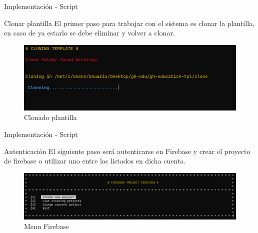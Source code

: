 \documentclass{beamer}
\begin{document}
    \begin{frame}{Implementación - Script}
    
        \begin{block}{Clonar plantilla}
            El primer paso para trabajar con el sistema es clonar la plantilla, en caso de ya estarlo se debe eliminar y volver a clonar.          
        \end{block}

        \begin{center}  
            \begin{figure}
                \includegraphics[width=.9\textwidth]{Presentacion/implementacion/script/clone.png}
                \caption{Clonado plantilla}
            \end{figure}            
        \end{center}
        
        
    \end{frame}  

    \begin{frame}{Implementación - Script}
    
        \begin{block}{Autenticación}
            El siguiente paso será autenticarse en Firebase y crear el proyecto de firebase o utilizar uno entre los listados en dicha cuenta.        
        \end{block}

        \begin{center}  
            \begin{figure}
                \includegraphics[width=.9\textwidth]{Presentacion/implementacion/script/firebase-initial.png}
                \caption{Menu Firebase}
            \end{figure}            
        \end{center}
        
        
    \end{frame}  
\end{document}
